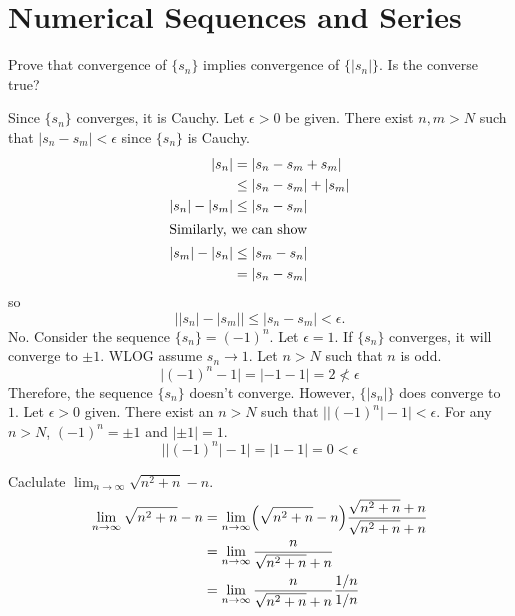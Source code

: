 \chapter{Numerical Sequences and Series}
\label{ch3}

\begin{exercise}
\item
  Prove that convergence of \(\{s_n\}\) implies convergence of
  \(\{\lvert s_n\rvert\}\).
  Is the converse true?
  \par\smallskip
  Since \(\{s_n\}\) converges, it is Cauchy.
  Let \(\epsilon > 0\) be given.
  There exist \(n,m > N\) such that \(\lvert s_n - s_m\rvert < \epsilon\) since
  \(\{s_n\}\) is Cauchy.
  \begin{align*}
    \lvert s_n\rvert & = \lvert s_n - s_m + s_m\rvert\\
                     & \leq \lvert s_n - s_m\rvert + \lvert s_m\rvert\\
    \lvert s_n\rvert - \lvert s_m\rvert & \leq \lvert s_n - s_m\rvert\\
    \intertext{Similarly, we can show}
    \lvert s_m\rvert - \lvert s_n\rvert & \leq \lvert s_m - s_n\rvert\\
                     & = \lvert s_n - s_m\rvert
  \end{align*}
  so
  \[
  \bigl\lvert\lvert s_n\rvert - \lvert s_m\rvert\bigr\rvert\leq
  \lvert s_n - s_m\rvert < \epsilon.
  \]
  No.
  Consider the sequence \(\{s_n\} = (-1)^n\).
  Let \(\epsilon = 1\).
  If \(\{s_n\}\) converges, it will converge to \(\pm 1\).
  WLOG assume \(s_n\to 1\).
  Let \(n > N\) such that \(n\) is odd.
  \[
  \lvert (-1)^n - 1\rvert = \lvert -1 - 1\rvert = 2\not < \epsilon
  \]
  Therefore, the sequence \(\{s_n\}\) doesn't converge.
  However, \(\{\lvert s_n\rvert\}\) does converge to \(1\).
  Let \(\epsilon > 0\) given.
  There exist an \(n > N\) such that
  \(\bigl\lvert\lvert (-1)^n\rvert - 1\bigr\rvert < \epsilon\).
  For any \(n > N\), \((-1)^n = \pm 1\) and \(\lvert \pm 1\rvert = 1\).
  \[
  \bigl\lvert\lvert (-1)^n\rvert - 1\bigr\rvert =
  \lvert 1 - 1\rvert = 0 < \epsilon
  \]
\item
  Caclulate \(\lim_{n\to\infty}\sqrt{n^2 + n} - n\).
  \begin{align*}
    \lim_{n\to\infty}\sqrt{n^2 + n} - n
    & = \lim_{n\to\infty}\Bigl(\sqrt{n^2 + n} - n\Bigr)
      \frac{\sqrt{n^2 + n} + n}{\sqrt{n^2 + n} + n}\\
    & = \lim_{n\to\infty}\frac{n}{\sqrt{n^2 + n} + n}\\
    & = \lim_{n\to\infty}\frac{n}{\sqrt{n^2 + n} + n}\frac{1/n}{1/n}\\

\end{align*}
\end{exercise}
